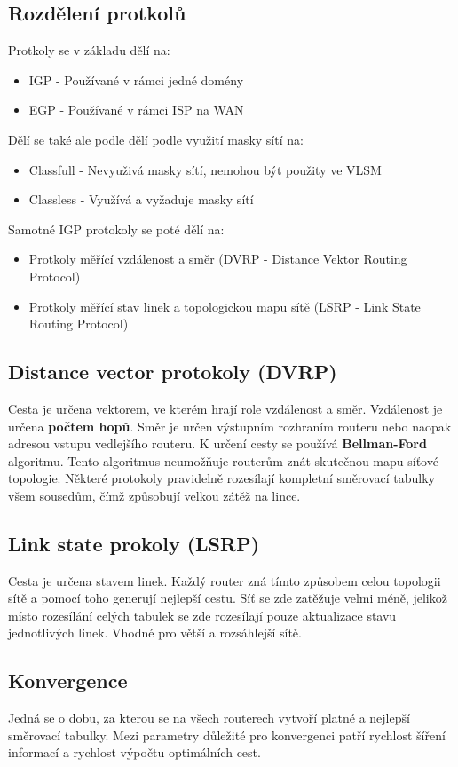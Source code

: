 \subsection{Rozdělení protkolů}
Protkoly se v základu dělí na:
\begin{itemize}
  \item IGP - Používané v rámci jedné domény
  \item EGP - Používané v rámci ISP na WAN
\end{itemize}
Dělí se také ale podle dělí podle využití masky sítí na:
\begin{itemize}
  \item Classfull - Nevyuživá masky sítí, nemohou být použity ve VLSM
  \item Classless - Využívá a vyžaduje masky sítí
\end{itemize}
Samotné IGP protokoly se poté dělí na:
\begin{itemize}
  \item Protkoly měřící vzdálenost a směr (DVRP - Distance Vektor Routing Protocol)
  \item Protkoly měřící stav linek a topologickou mapu sítě (LSRP - Link State Routing Protocol)
\end{itemize}
\subsection{Distance vector protokoly (DVRP)}
Cesta je určena vektorem, ve kterém hrají role vzdálenost a směr.
Vzdálenost je určena \textbf{počtem hopů}.
Směr je určen výstupním rozhraním routeru nebo naopak adresou vstupu vedlejšího routeru.
K určení cesty se používá \textbf{Bellman-Ford} algoritmu.
Tento algoritmus neumožňuje routerům znát skutečnou mapu síťové topologie.
Některé protokoly pravidelně rozesílají kompletní směrovací tabulky všem sousedům, čímž způsobují velkou zátěž na lince.
\subsection{Link state prokoly (LSRP)}
Cesta je určena stavem linek.
Každý router zná tímto způsobem celou topologii sítě a pomocí toho generují nejlepší cestu.
Síť se zde zatěžuje velmi méně, jelikož místo rozesílání celých tabulek se zde rozesílají pouze aktualizace stavu jednotlivých linek.
Vhodné pro větší a rozsáhlejší sítě.
\subsection{Konvergence}
Jedná se o dobu, za kterou se na všech routerech vytvoří platné a nejlepší směrovací tabulky.
Mezi parametry důležité pro konvergenci patří rychlost šíření informací a rychlost výpočtu optimálních cest.
